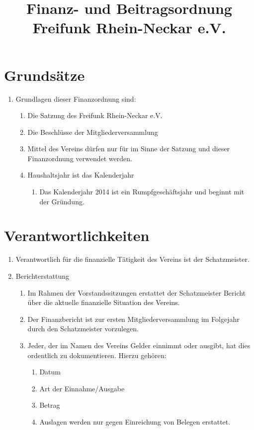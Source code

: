 \documentclass[12pt,a4paper,titlepage]{scrartcl}
\title{Finanz- und Beitragsordnung\\ Freifunk Rhein-Neckar e.V.}
\begin{document}
\maketitle
{}
\thispagestyle{empty}
\newpage
{}
\setcounter{page}{1}

\section{Grundsätze}
\begin{enumerate}
\item Grundlagen dieser Finanzordnung sind:
	\begin{enumerate}
	\item Die Satzung des Freifunk Rhein-Neckar e.V.
	\item Die Beschlüsse der Mitgliederversammlung 
	\item Mittel des Vereins dürfen nur für im Sinne der Satzung und dieser Finanzordnung 
verwendet werden. 
	\item Haushaltsjahr ist das Kalenderjahr 
		\begin{enumerate}
		\item Das Kalenderjahr 2014 ist ein Rumpfgeschäftsjahr und beginnt mit der Gründung. 
		\end{enumerate}
	\end{enumerate}
\end{enumerate}
	
\section{Verantwortlichkeiten}
\begin{enumerate}
\item Verantwortlich für die finanzielle Tätigkeit des Vereins ist der Schatzmeister. 
\item Berichterstattung 
	\begin{enumerate}
	\item Im Rahmen der Vorstandssitzungen erstattet der Schatzmeister Bericht über 
die aktuelle finanzielle Situation des Vereins. 
	\item Der Finanzbericht ist zur ersten Mitgliederversammlung im Folgejahr durch 
den Schatzmeister vorzulegen. 
	\item Jeder, der im Namen des Vereins Gelder einnimmt oder ausgibt, hat dies ordentlich zu dokumentieren. Hierzu gehören:
		\begin{enumerate}
		\item Datum 
		\item Art der Einnahme/Ausgabe 
		\item Betrag 
		\item Auslagen werden nur gegen Einreichung von Belegen erstattet. 
		\end{enumerate}
	\end{enumerate}
\end{enumerate}
\end{document}
